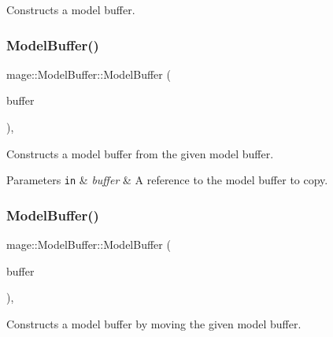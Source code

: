Constructs a model buffer. \hypertarget{structmage_1_1_model_buffer_afd3db5ed055cfa00f7f68d63898fb6c7}{}\label{structmage_1_1_model_buffer_afd3db5ed055cfa00f7f68d63898fb6c7} 
\subsubsection{\texorpdfstring{Model\+Buffer()}{ModelBuffer()}\hspace{0.1cm}{\footnotesize\ttfamily [2/3]}}
{\footnotesize\ttfamily mage\+::\+Model\+Buffer\+::\+Model\+Buffer (\begin{DoxyParamCaption}\item[{const \hyperlink{structmage_1_1_model_buffer}{Model\+Buffer} \&}]{buffer }\end{DoxyParamCaption})\hspace{0.3cm}{\ttfamily [default]}, {\ttfamily [noexcept]}}

Constructs a model buffer from the given model buffer.


\begin{DoxyParams}[1]{Parameters}
\mbox{\tt in}  & {\em buffer} & A reference to the model buffer to copy. \\
\hline
\end{DoxyParams}
\hypertarget{structmage_1_1_model_buffer_a4ff1edb2bd6e40ec73bf722c8a394ac0}{}\label{structmage_1_1_model_buffer_a4ff1edb2bd6e40ec73bf722c8a394ac0} 
\subsubsection{\texorpdfstring{Model\+Buffer()}{ModelBuffer()}\hspace{0.1cm}{\footnotesize\ttfamily [3/3]}}
{\footnotesize\ttfamily mage\+::\+Model\+Buffer\+::\+Model\+Buffer (\begin{DoxyParamCaption}\item[{\hyperlink{structmage_1_1_model_buffer}{Model\+Buffer} \&\&}]{buffer }\end{DoxyParamCaption})\hspace{0.3cm}{\ttfamily [default]}, {\ttfamily [noexcept]}}

Constructs a model buffer by moving the given model buffer.


